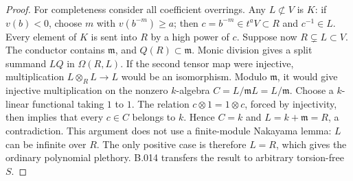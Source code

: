 \begin{proof}
For completeness consider all coefficient overrings. Any
$L\not\subset V$ is $K$: if $v(b)<0$, choose $m$ with $v(b^{-m})\ge a$; then
$c=b^{-m}\in t^aV\subset R$ and $c^{-1}\in L$. Every element
of $K$ is sent into $R$ by a high power of $c$.
Suppose now $R\subsetneq L\subset V$. The conductor contains
$\mathfrak m$, and $Q(R)\subset\mathfrak m$.
Monic division gives a split summand $LQ$ in $\Omega(R,L)$.
If the second tensor map were injective, multiplication
$L\otimes_RL\to L$ would be an isomorphism. Modulo
$\mathfrak m$, it would give injective multiplication on the
nonzero $k$-algebra $C=L/\mathfrak mL=L/\mathfrak m$.
Choose a $k$-linear functional taking $1$ to $1$.
The relation $c\otimes1=1\otimes c$, forced by injectivity,
then implies that every $c\in C$ belongs to $k$.
Hence $C=k$ and $L=k+\mathfrak m=R$, a contradiction.
This argument does not use a finite-module Nakayama lemma:
$L$ can be infinite over $R$.
The only positive case is therefore $L=R$, which gives the
ordinary polynomial plethory. B.014 transfers the result to
arbitrary torsion-free $S$.
\end{proof}
